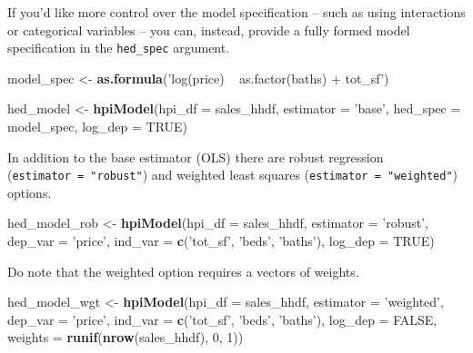\documentclass[]{article}
\newenvironment{Shaded}{\begin{snugshade}}{\end{snugshade}}
\newcommand{\DataTypeTok}[1]{\textcolor[rgb]{0.13,0.29,0.53}{#1}}
\newcommand{\DecValTok}[1]{\textcolor[rgb]{0.00,0.00,0.81}{#1}}
\newcommand{\KeywordTok}[1]{\textcolor[rgb]{0.13,0.29,0.53}{\textbf{#1}}}
\newcommand{\NormalTok}[1]{#1}
\newcommand{\OtherTok}[1]{\textcolor[rgb]{0.56,0.35,0.01}{#1}}
\newcommand{\StringTok}[1]{\textcolor[rgb]{0.31,0.60,0.02}{#1}}
\begin{document}
If you'd like more control over the model specification -- such as using
interactions or categorical variables -- you can, instead, provide a
fully formed model specification in the \texttt{hed\_spec} argument.

\begin{Shaded}
\begin{Highlighting}[]
\NormalTok{  model_spec <-}\StringTok{ }\KeywordTok{as.formula}\NormalTok{(}\StringTok{'log(price) ~ as.factor(baths) + tot_sf'}\NormalTok{)}
  
\NormalTok{  hed_model <-}\StringTok{ }\KeywordTok{hpiModel}\NormalTok{(}\DataTypeTok{hpi_df =}\NormalTok{ sales_hhdf,}
                        \DataTypeTok{estimator =} \StringTok{'base'}\NormalTok{,}
                        \DataTypeTok{hed_spec =}\NormalTok{ model_spec,}
                        \DataTypeTok{log_dep =} \OtherTok{TRUE}\NormalTok{)}
\end{Highlighting}
\end{Shaded}

In addition to the base estimator (OLS) there are robust regression
(\texttt{estimator\ =\ "robust"}) and weighted least squares
(\texttt{estimator\ =\ "weighted"}) options.

\begin{Shaded}
\begin{Highlighting}[]
\NormalTok{  hed_model_rob <-}\StringTok{ }\KeywordTok{hpiModel}\NormalTok{(}\DataTypeTok{hpi_df =}\NormalTok{ sales_hhdf,}
                            \DataTypeTok{estimator =} \StringTok{'robust'}\NormalTok{,}
                            \DataTypeTok{dep_var =} \StringTok{'price'}\NormalTok{,}
                            \DataTypeTok{ind_var =} \KeywordTok{c}\NormalTok{(}\StringTok{'tot_sf'}\NormalTok{, }\StringTok{'beds'}\NormalTok{, }\StringTok{'baths'}\NormalTok{),}
                            \DataTypeTok{log_dep =} \OtherTok{TRUE}\NormalTok{)}
\end{Highlighting}
\end{Shaded}

Do note that the weighted option requires a vectors of weights.

\begin{Shaded}
\begin{Highlighting}[]
\NormalTok{  hed_model_wgt <-}\StringTok{ }\KeywordTok{hpiModel}\NormalTok{(}\DataTypeTok{hpi_df =}\NormalTok{ sales_hhdf,}
                            \DataTypeTok{estimator =} \StringTok{'weighted'}\NormalTok{,}
                            \DataTypeTok{dep_var =} \StringTok{'price'}\NormalTok{,}
                            \DataTypeTok{ind_var =} \KeywordTok{c}\NormalTok{(}\StringTok{'tot_sf'}\NormalTok{, }\StringTok{'beds'}\NormalTok{, }\StringTok{'baths'}\NormalTok{),}
                            \DataTypeTok{log_dep =} \OtherTok{FALSE}\NormalTok{,}
                            \DataTypeTok{weights =} \KeywordTok{runif}\NormalTok{(}\KeywordTok{nrow}\NormalTok{(sales_hhdf), }\DecValTok{0}\NormalTok{, }\DecValTok{1}\NormalTok{))}
\end{Highlighting}
\end{Shaded}
\end{document}
